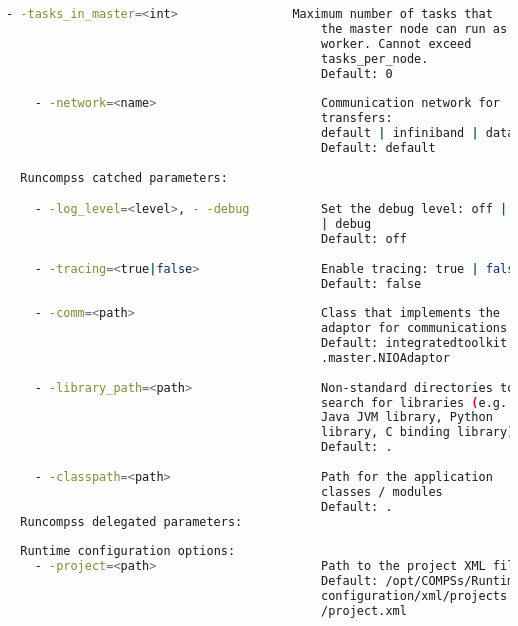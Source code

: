 \begin{lstlisting}[language=bash]
    - -tasks_in_master=<int>                Maximum number of tasks that
                                            the master node can run as 
                                            worker. Cannot exceed 
                                            tasks_per_node.
                                            Default: 0
                                            
    - -network=<name>                       Communication network for 
                                            transfers:
                                            default | infiniband | data.
                                            Default: default
                                            
  Runcompss catched parameters:

    - -log_level=<level>, - -debug          Set the debug level: off | info 
                                            | debug
                                            Default: off
                                            
    - -tracing=<true|false>                 Enable tracing: true | false
                                            Default: false
                                            
    - -comm=<path>                          Class that implements the 
                                            adaptor for communications
                                            Default: integratedtoolkit.nio
                                            .master.NIOAdaptor
                                            
    - -library_path=<path>                  Non-standard directories to
                                            search for libraries (e.g. 
                                            Java JVM library, Python
                                            library, C binding library) 
                                            Default: .
                                            
    - -classpath=<path>                     Path for the application 
                                            classes / modules
                                            Default: .
  Runcompss delegated parameters:
                                            
  Runtime configuration options:
    - -project=<path>                       Path to the project XML file
                                            Default: /opt/COMPSs/Runtime/
                                            configuration/xml/projects
                                            /project.xml
                                            

\end{lstlisting}

